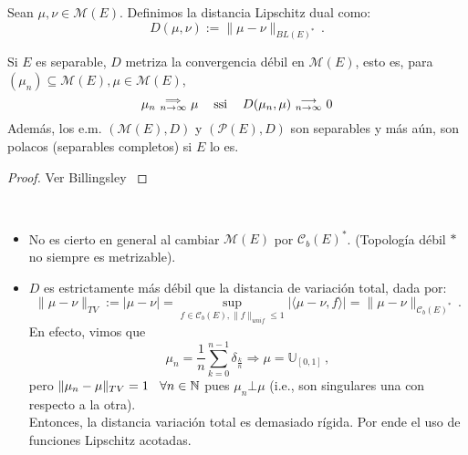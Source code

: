 \begin{definition}
Sean $\mu,\nu\in\mathcal{M}(E)$. Definimos la distancia Lipschitz dual como: $$D(\mu,\nu):=\|\mu-\nu\|_{BL(E)^*} \, .$$
\end{definition}

\begin{theorem}
Si $E$ es separable, $D$ metriza la convergencia débil en $\mathcal{M}(E)$, esto es, para  $(\mu_n)\subseteq\mathcal{M}(E),\mu\in\mathcal{M}(E)$,
$$ \mu_n \mbox{ }\substack{\Longrightarrow \\n \to \infty}\mbox{ } \mu \hspace{.25cm}\, \mbox{ ssi } \hspace{.25cm}\, D(\mu_n,\mu)\mbox{ }\substack{\longrightarrow \\ n\to\infty}\mbox{ }0$$
Además, los e.m. $(\mathcal{M}(E),D)$ y $(\mathcal{P}(E),D)$ son separables y más aún, son polacos (separables completos) si $E$ lo es.
\end{theorem}
\begin{proof}
\gris Ver Billingsley \cite{billing} \negro
\end{proof}
\vspace{2cm} \\
\begin{remark}
\beforeitemize
\begin{itemize}
\item No es cierto en general al cambiar $\mathcal{M}(E)$ por $\mathcal{C}_b(E)^*$. (Topología débil $*$ no siempre es metrizable).
\item $D$ es estrictamente más débil que la distancia de variación total, dada por: 
$$\|\mu-\nu\|_{TV}:=|\mu-\nu|= \displaystyle\sup_{f\in \mathcal{C}_b(E),\|f\|_{unif}\leq 1}|\langle \mu-\nu,f\rangle|=\|\mu-\nu\|_{\mathcal{C}_b(E)^*} \, . $$
En efecto,  vimos que
$$ \mu_n=\frac{1}{n}\displaystyle\sum^{n-1}_{k=0}\delta_{\frac{k}{n}}\Longrightarrow\mu=\mathbb{U}_{[0,1]} \, , $$
pero $\|\mu_n-\mu\|_{TV}=1\hspace{.25cm}\,\forall n\in\mathbb{N}$ pues $\mu_n\bot\mu$ (i.e., son singulares una con respecto a la otra). 
\\ Entonces, la distancia variación total es demasiado rígida. Por ende el uso de funciones Lipschitz acotadas.
\end{itemize}
\end{remark}


